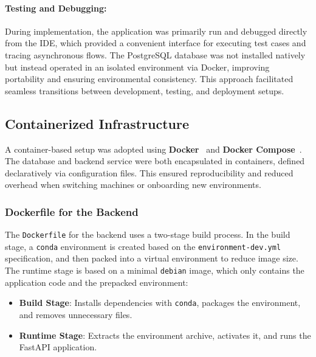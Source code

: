 \paragraph{Testing and Debugging:}
During implementation, the application was primarily run and debugged directly from the IDE, which provided a convenient interface for executing test cases and tracing asynchronous flows. The PostgreSQL database was not installed natively but instead operated in an isolated environment via Docker, improving portability and ensuring environmental consistency. This approach facilitated seamless transitions between development, testing, and deployment setups.

\newpage
\subsection{Containerized Infrastructure}
A container-based setup was adopted using \textbf{Docker}~\cite{docker} and \textbf{Docker Compose}~\cite{docker-compose}. The database and backend service were both encapsulated in containers, defined declaratively via configuration files. This ensured reproducibility and reduced overhead when switching machines or onboarding new environments.

\subsubsection{Dockerfile for the Backend}

The \texttt{Dockerfile} for the backend uses a two-stage build process. In the build stage, a \texttt{conda} environment is created based on the \texttt{environment-dev.yml} specification, and then packed into a virtual environment to reduce image size. The runtime stage is based on a minimal \texttt{debian} image, which only contains the application code and the prepacked environment:

\begin{itemize}
    \item \textbf{Build Stage}: Installs dependencies with \texttt{conda}, packages the environment, and removes unnecessary files.
    \item \textbf{Runtime Stage}: Extracts the environment archive, activates it, and runs the FastAPI application.
\end{itemize}

